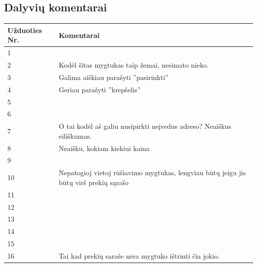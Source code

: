 \documentclass[oneside]{VUMIFPSkursinis}
\begin{document}
	\subsection{Dalyvių komentarai}
\begin{center}
    \begin{tabular}{ |p{3cm}| p{12cm} |}
    \hline
	Užduoties Nr.&Komentarai\\ \hline
	1&\\ \hline
	2&Kodėl šitas mygtukas taip žemai, nesimato nieko.\\ \hline
	3&Galima aiškiau parašyti ''pasirinkti''\\ \hline
	4&Geriau parašyti ''krepšelis''\\ \hline
	5&\\ \hline
	6&\\ \hline
	7&O tai kodėl aš galiu nusipirkti neįvedus adreso? Neaiškus eiliškumas.\\ \hline
	8&Neaišku, kokiam kiekiui kaina\\ \hline
	9&\\ \hline
	10&Nepatogioj vietoj rūšiavimo mygtukas, lengviau būtų jeigu jis būtų virš prekių sąrašo\\ \hline
	11&\\ \hline
	12&\\ \hline
	13&\\ \hline
	14&\\ \hline
	15&\\ \hline
	16&Tai kad prekių saraše nėra mygtuko ištrinti čia jokio.\\ \hline
   \hline
    \end{tabular}
\end{center}

		
\end{document}
